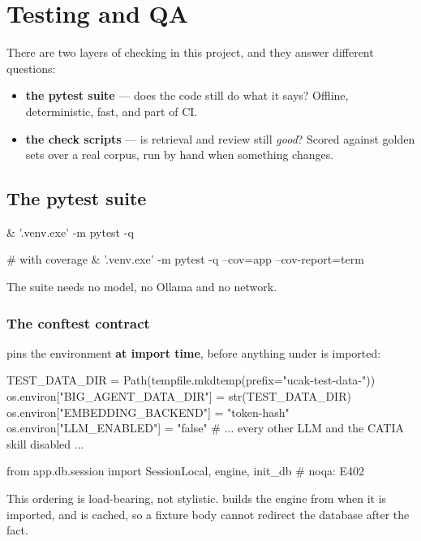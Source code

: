 \chapter{Testing and QA}
\label{ch:testing}

There are two layers of checking in this project, and they answer different
questions:

\begin{itemize}
\item \textbf{the pytest suite} --- does the code still do what it says? Offline,
deterministic, fast, and part of CI.
\item \textbf{the check scripts} --- is retrieval and review still \emph{good}?
Scored against golden sets over a real corpus, run by hand when something
changes.
\end{itemize}

\section{The pytest suite}

\begin{shellblock}
& '.venv\Scripts\python.exe' -m pytest -q

# with coverage
& '.venv\Scripts\python.exe' -m pytest -q --cov=app --cov-report=term
\end{shellblock}

The suite needs no model, no Ollama and no network.

\subsection{The conftest contract}

 pins the environment \textbf{at import time}, before
anything under  is imported:

\begin{pyblock}
TEST_DATA_DIR = Path(tempfile.mkdtemp(prefix="ucak-test-data-"))
os.environ["BIG_AGENT_DATA_DIR"] = str(TEST_DATA_DIR)
os.environ["EMBEDDING_BACKEND"] = "token-hash"
os.environ["LLM_ENABLED"] = "false"
# ... every other LLM and the CATIA skill disabled ...

from app.db.session import SessionLocal, engine, init_db  # noqa: E402
\end{pyblock}

This ordering is load-bearing, not stylistic.  builds the
engine from  when it is imported, and  is
cached, so a fixture body cannot redirect the database after the fact.

